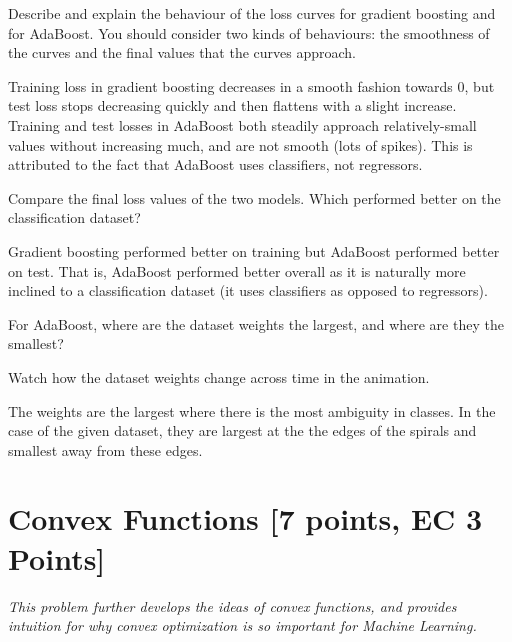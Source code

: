 \begin{problem}[2]
    Describe and explain the behaviour of the loss curves for gradient boosting and for AdaBoost. You should consider two kinds of behaviours: the smoothness of the curves and the final values that the curves approach.
\end{problem}
\begin{solution}
    Training loss in gradient boosting decreases in a smooth fashion towards 0, but test loss stops decreasing quickly and then flattens with a slight increase. Training and test losses in AdaBoost both steadily approach relatively-small values without increasing much, and are not smooth (lots of spikes). This is attributed to the fact that AdaBoost uses classifiers, not regressors.
\end{solution}

\begin{problem}[2]
    Compare the final loss values of the two models. Which performed better on the classification dataset?
\end{problem}
\begin{solution}
    Gradient boosting performed better on training but AdaBoost performed better on test. That is, AdaBoost performed better overall as it is naturally more inclined to a classification dataset (it uses classifiers as opposed to regressors).
\end{solution}

\begin{problem}[2]
    For AdaBoost, where are the dataset weights the largest, and where are they the smallest?
\end{problem}
\begin{hint}
    Watch how the dataset weights change across time in the animation.
\end{hint}
\begin{solution}
    The weights are the largest where there is the most ambiguity in classes. In the case of the given dataset, they are largest at the the edges of the spirals and smallest away from these edges.
\end{solution}

\newpage
\section{Convex Functions [7 points, EC 3 Points]}

\emph{This problem further develops the ideas of convex functions, and provides intuition for why convex optimization is so important for
 Machine Learning.}

